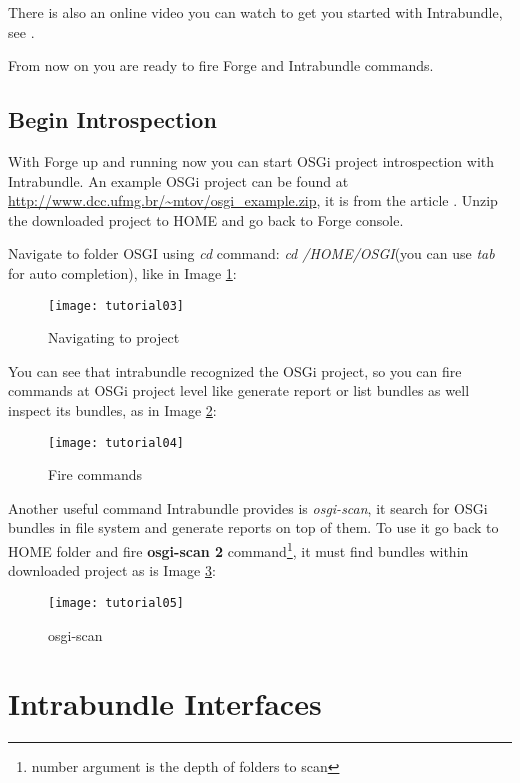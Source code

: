 \begin{appendices}
There is also an online video you can watch to get you started with Intrabundle, see \citep{intrabundle github 2014}.

From now on you are ready to fire Forge and Intrabundle commands. 

\section{Begin Introspection}
With Forge up and running now you can start OSGi project introspection with Intrabundle. An example OSGi project can be found at \\
 \href{http://www.dcc.ufmg.br/\textasciitilde{}mtov/osgi\_example.zip}{http://www.dcc.ufmg.br/\textasciitilde{}mtov/osgi\_example.zip}, it is from the article \citep{Tavares 2008}.
Unzip the downloaded project to HOME and go back to Forge console.

Navigate to folder OSGI using \emph{cd} command: \emph{cd /HOME/OSGI}(you can use \emph{tab} for auto completion), like in Image \ref{navigate project}:

\begin{figure}[h]
\caption{Navigating to project}
\label{navigate project}
\centering
\texttt{[image: tutorial03]}
\end{figure}
\FloatBarrier
 
You can see that intrabundle recognized the OSGi project, so you can fire commands at OSGi project level like generate report or list bundles as well inspect its bundles, as in Image \ref{fire commands}:

\begin{figure}[h]
\caption{Fire commands}
\label{fire commands}
\centering
\texttt{[image: tutorial04]}
\end{figure}
\FloatBarrier

Another useful command Intrabundle provides is \emph{osgi-scan}, it search for OSGi bundles in file system and generate reports on top of them. To use it go back to HOME folder and fire \textbf{osgi-scan 2} command\footnote{number argument is the depth of folders to scan}, it must find bundles within downloaded project as is Image \ref{osgi-scan}:

\begin{figure}[h]
\caption{osgi-scan}
\label{osgi-scan}
\centering
\texttt{[image: tutorial05]}
\end{figure}
\FloatBarrier

\chapter{Intrabundle Interfaces}
\label{ch:code-interfaces}


\end{appendices}
